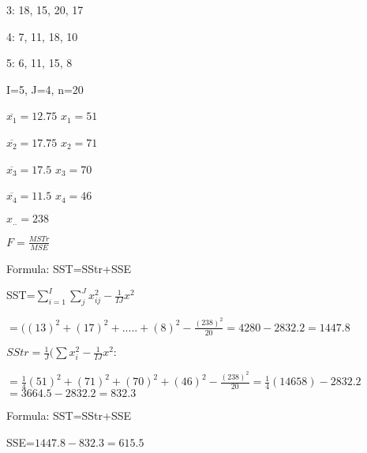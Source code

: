 \documentclass{article}
\begin{document}
3: 18, 15, 20, 17

\vspace{2mm}

4: 7, 11, 18, 10

\vspace{2mm}

5: 6, 11, 15, 8

\vspace{2mm}

I=5, J=4, n=20

\vspace{2mm}

$\overline{x_{1}}=12.75$
$x_{1}=51$

\vspace{2mm}


$\overline{x_{2}}=17.75$
$x_{2}=71$

\vspace{2mm}

$\overline{x_{3}}=17.5$
$x_{3}=70$

\vspace{2mm}

$\overline{x_{4}}=11.5$
$x_{4}=46$

\vspace{2mm}

$x_{..}=238$

\vspace{2mm}

$F=\frac{MSTr}{MSE}$

\vspace{2mm}

Formula: SST=SStr+SSE

\vspace{2mm}

SST=$\sum^{I}_{i=1} \sum^{J}_{j} x^{2}_{ij} -\frac{1}{IJ}x^{2}$

$=((13)^{2}+(17)^{2}+.....+(8)^{2}-\frac{(238)^{2}}{20}=4280-2832.2=1447.8$

\vspace{2mm}

$SStr=\frac{1}{J}(\sum x_{i}^{2}-\frac{1}{IJ}x^{2}:$

$=\frac{1}{4}(51)^{2}+(71)^{2}+(70)^{2}+(46)^{2}-\frac{(238)^{2}}{20}=\frac{1}{4}(14658)-2832.2$
$=3664.5-2832.2=832.3$

\vspace{2mm}

Formula: SST=SStr+SSE

\vspace{2mm}

SSE=$1447.8-832.3=615.5$
\end{document}
